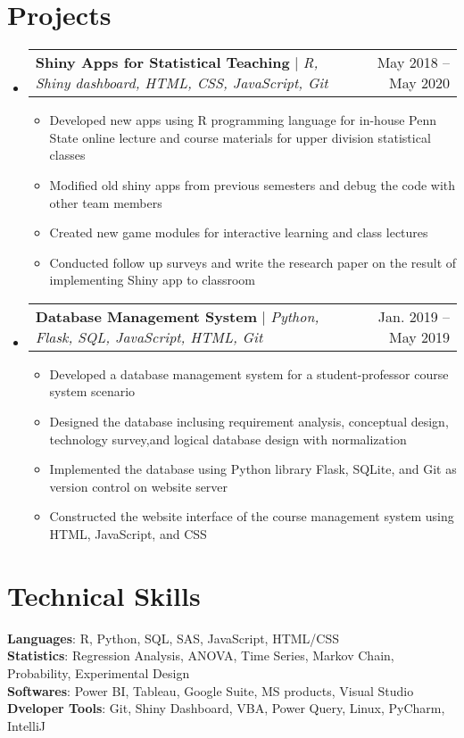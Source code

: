 \documentclass[letterpaper,11pt]{article}
\makeatletter
\newcommand{\resumeItem}[1]{
  \item\small{
    {#1 \vspace{-2pt}}
  }
}
\newcommand{\resumeProjectHeading}[2]{
    \item
    \begin{tabular*}{0.97\textwidth}{l@{\extracolsep{\fill}}r}
      \small#1 & #2 \\
    \end{tabular*}\vspace{-7pt}
}
\newcommand{\resumeSubHeadingListStart}{\begin{itemize}[leftmargin=0.15in, label={}]}
\newcommand{\resumeSubHeadingListEnd}{\end{itemize}}
\newcommand{\resumeItemListStart}{\begin{itemize}}
\newcommand{\resumeItemListEnd}{\end{itemize}\vspace{-5pt}}
\makeatother
\begin{document}
\section{Projects}
    \resumeSubHeadingListStart
      \resumeProjectHeading
          {\textbf{Shiny Apps for Statistical Teaching} $|$ \emph{R, Shiny dashboard, HTML, CSS, JavaScript, Git}}{May 2018 -- May 2020}
          \resumeItemListStart
            \resumeItem{Developed new apps using R programming language for in-house Penn State online lecture and course materials for upper division statistical classes}
            \resumeItem{Modified old shiny apps from previous semesters and debug the code with other team members }
            \resumeItem{Created new game modules for interactive learning and class lectures}
            \resumeItem{Conducted follow up surveys and write the research paper on the result of implementing Shiny app to classroom}
          \resumeItemListEnd
      \resumeProjectHeading
          {\textbf{Database Management System} $|$ \emph{Python, Flask, SQL, JavaScript, HTML, Git}}{Jan. 2019 -- May 2019}
          \resumeItemListStart
            \resumeItem{Developed a database management system for a student-professor course system scenario}
            \resumeItem{Designed the database inclusing requirement analysis, conceptual design, technology survey,and logical database design with normalization}
            \resumeItem{Implemented the database using Python library Flask, SQLite, and Git as version control on website server}
            \resumeItem{Constructed the website interface of the course management system using HTML, JavaScript, and CSS}
          \resumeItemListEnd
    \resumeSubHeadingListEnd



%
\section{Technical Skills}
 \begin{itemize}[leftmargin=0.15in, label={}]
    \small{\item{
     \textbf{Languages}{: R, Python, SQL, SAS, JavaScript, HTML/CSS} \\
     \textbf{Statistics}{: Regression Analysis, ANOVA, Time Series, Markov Chain, Probability, Experimental Design} \\
     \textbf{Softwares}{: Power BI, Tableau, Google Suite, MS products, Visual Studio} \\
     \textbf{Dveloper Tools}{: Git, Shiny Dashboard, VBA, Power Query, Linux, PyCharm, IntelliJ}
    }}
 \end{itemize}


\end{document}
